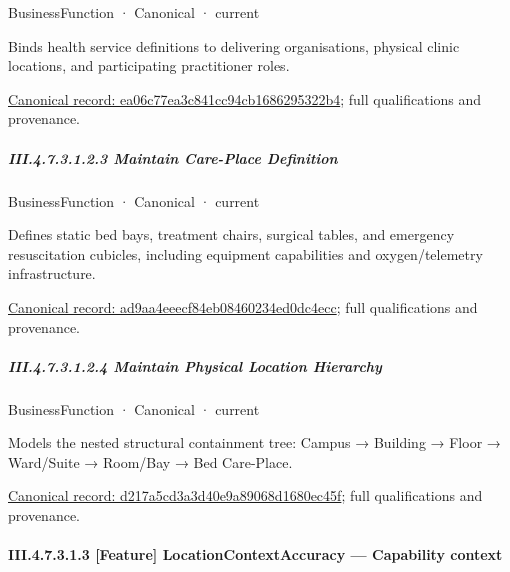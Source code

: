 \label{element:ea06c77ea3c841cc94cb1686295322b4}
{\small BusinessFunction · Canonical · current}\par

Binds health service definitions to delivering organisations, physical clinic locations, and participating practitioner roles.


{\footnotesize \href{../../../../../../../continuum/business/business-function/ea06c77ea3c841cc94cb1686295322b4.md}{Canonical record: ea06c77ea3c841cc94cb1686295322b4}; full qualifications and provenance.}\par
\subparagraph*{III.4.7.3.1.2.3 Maintain Care-Place Definition}
\label{navigation:III.4.7.3.1.2.3}

\label{element:ad9aa4eeecf84eb08460234ed0dc4ecc}
{\small BusinessFunction · Canonical · current}\par

Defines static bed bays, treatment chairs, surgical tables, and emergency resuscitation cubicles, including equipment capabilities and oxygen/telemetry infrastructure.


{\footnotesize \href{../../../../../../../continuum/business/business-function/ad9aa4eeecf84eb08460234ed0dc4ecc.md}{Canonical record: ad9aa4eeecf84eb08460234ed0dc4ecc}; full qualifications and provenance.}\par
\subparagraph*{III.4.7.3.1.2.4 Maintain Physical Location Hierarchy}
\label{navigation:III.4.7.3.1.2.4}

\label{element:d217a5cd3a3d40e9a89068d1680ec45f}
{\small BusinessFunction · Canonical · current}\par

Models the nested structural containment tree: Campus → Building → Floor → Ward/Suite → Room/Bay → Bed Care-Place.


{\footnotesize \href{../../../../../../../continuum/business/business-function/d217a5cd3a3d40e9a89068d1680ec45f.md}{Canonical record: d217a5cd3a3d40e9a89068d1680ec45f}; full qualifications and provenance.}\par
\paragraph*{III.4.7.3.1.3 [Feature] LocationContextAccuracy — Capability context}
\label{navigation:III.4.7.3.1.3}

